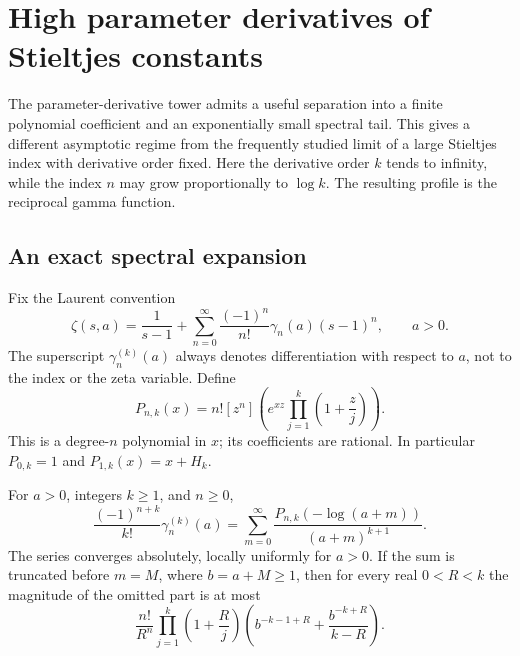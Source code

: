 \section{High parameter derivatives of Stieltjes constants}
\label{spectral:sec:asymptotics}

The parameter-derivative tower admits a useful separation into a
finite polynomial coefficient and an exponentially small spectral
tail. This gives a different asymptotic regime from the frequently
studied limit of a large Stieltjes index with derivative order fixed.
Here the derivative order \(k\) tends to infinity, while the index
\(n\) may grow proportionally to \(\log k\). The resulting profile is
the reciprocal gamma function.

\subsection{An exact spectral expansion}

Fix the Laurent convention
\begin{equation}\label{spectral:eq:stieltjes-convention}
\zeta(s,a)=\frac{1}{s-1}
 +\sum_{n=0}^{\infty}\frac{(-1)^n}{n!}\gamma_n(a)(s-1)^n,
\qquad a>0.
\end{equation}
The superscript \(\gamma_n^{(k)}(a)\) always denotes differentiation
with respect to \(a\), not to the index or the zeta variable. Define
\begin{equation}\label{spectral:eq:coefficient-polynomial}
P_{n,k}(x)=n![z^n]\left(e^{xz}\prod_{j=1}^{k}
                  \left(1+\frac zj\right)\right).
\end{equation}
This is a degree-\(n\) polynomial in \(x\); its coefficients are
rational. In particular \(P_{0,k}=1\) and
\(P_{1,k}(x)=x+H_k\).

\begin{theorem}
\label{spectral:thm:spectral}
For \(a>0\), integers \(k\ge1\), and \(n\ge0\),
\begin{equation}\label{spectral:eq:spectral}
\frac{(-1)^{n+k}}{k!}\gamma_n^{(k)}(a)
=\sum_{m=0}^{\infty}
 \frac{P_{n,k}(-\log(a+m))}{(a+m)^{k+1}}.
\end{equation}
The series converges absolutely, locally uniformly for \(a>0\).
If the sum is truncated before \(m=M\), where \(b=a+M\ge1\),
then for every real \(0<R<k\) the magnitude of the omitted part is at
most
\begin{equation}\label{spectral:eq:spectral-tail}
\frac{n!}{R^n}\prod_{j=1}^{k}\left(1+\frac Rj\right)
\left(b^{-k-1+R}+\frac{b^{-k+R}}{k-R}\right).
\end{equation}
\end{theorem}

